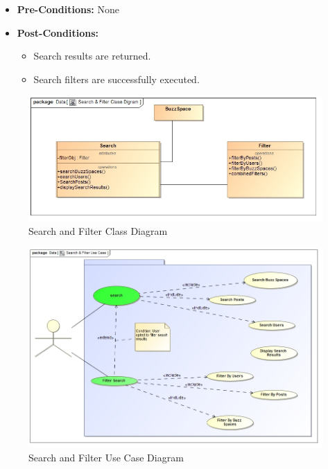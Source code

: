 \documentclass[11pt]{article}
\begin{document}
\begin{enumerate}
\begin{itemize}
 
	\item\textbf{Pre-Conditions:} None
	\item\textbf{Post-Conditions: }
	    \begin{itemize}
		\item Search results are returned.
	  	\item Search filters are successfully executed.
	     \end{itemize}
  \end{itemize}
	\graphicspath{ {../Diagrams/Sphe/Search&Filter/} }
		 \begin{figure}[H]	
	 		\includegraphics[scale=0.65,center]{ClassDiagram.jpg}
    			\caption{Search and Filter Class Diagram}
		\end{figure}
	\graphicspath{ {../Diagrams/Sphe/Search&Filter/} }
		\begin{figure}[H]	
    			\includegraphics[scale=0.5,center]{UseCase.jpg}
    			\caption{Search and Filter Use Case Diagram}
		\end{figure}
	

\end{enumerate}
\end{document}
